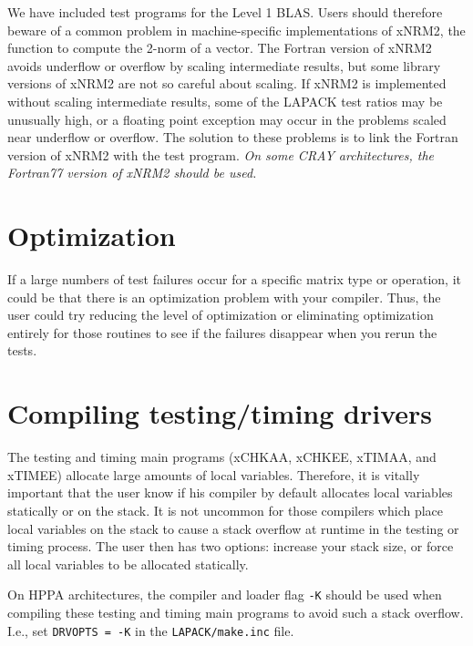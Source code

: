 \documentclass[11pt]{report}
\begin{document}
We have included test programs for the Level 1 BLAS.
Users should therefore beware of a common problem in machine-specific
implementations of xNRM2,
the function to compute the 2-norm of a vector.
The Fortran version of xNRM2 avoids underflow or overflow
by scaling intermediate results, but some library versions of xNRM2
are not so careful about scaling.
If xNRM2 is implemented without scaling intermediate results, some of
the LAPACK test ratios may be unusually high, or
a floating point exception may occur in the problems scaled near
underflow or overflow.
The solution to these problems is to link the Fortran version of
xNRM2 with the test program.  \emph{On some CRAY architectures, the Fortran77
version of xNRM2 should be used.}

\section{Optimization}

If a large numbers of test failures occur for a specific matrix type
or operation, it could be that there is an optimization problem with
your compiler.  Thus, the user could try reducing the level of
optimization or eliminating optimization entirely for those routines
to see if the failures disappear when you rerun the tests.


\section{Compiling testing/timing drivers}

The testing and timing main programs (xCHKAA, xCHKEE, xTIMAA, and
xTIMEE)
allocate large amounts of local variables.  Therefore, it is vitally
important that the user know if his compiler by default allocates local
variables statically or on the stack.  It is not uncommon for those
compilers which place local variables on the stack to cause a stack
overflow at runtime in the testing or timing process.  The user then
has two options:  increase your stack size, or force all local variables
to be allocated statically.

On HPPA architectures, the 
compiler and loader flag \texttt{-K} should be used when compiling these testing
and timing main programs to avoid such a stack overflow.  I.e., set
\texttt{DRVOPTS = -K} in the \texttt{LAPACK/make.inc} file.
\end{document}
